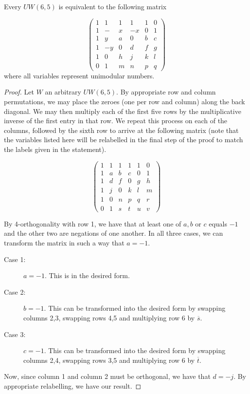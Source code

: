 \begin{lemma} \label{lem:uw65-norm}
 Every $UW(6,5)$ is equivalent to the following matrix

$$\left(\begin{array}{rrrrrr}
 1 &  1 & 1 & 1 & 1 & 0 \\
 1 &  - & x & -x & 0 & 1 \\
 1 &  y & a & 0 & b & c \\
 1 &  -y & 0 & d & f & g \\
 1 &  0 & h & j & k & l \\
 0 &  1 & m & n & p & q
\end{array}\right)$$
where all variables represent unimodular numbers.

\begin{proof}
 Let $W$ an arbitrary $UW(6,5)$. By appropriate row and column permutations, we may place the zeroes (one per row and column) along the back diagonal. We may then multiply each of the first five rows by the multiplicative inverse of the first entry in that row. We repeat this process on each of the columns, followed by the sixth row to arrive at the following matrix (note that the variables listed here will be relabelled in the final step of the proof to match the labels given in the statement).

$$\left(\begin{array}{rrrrrr}
 1 &  1 & 1 & 1 & 1 & 0 \\
 1 &  a & b & c & 0 & 1 \\
 1 &  d & f & 0 & g & h \\
 1 &  j & 0 & k & l & m \\
 1 &  0 & n & p & q & r \\
 0 &  1 & s & t & u & v
\end{array}\right)$$

By 4-orthogonality with row 1, we have that at least one of $a,b$ or $c$ equals $-1$ and the other two are negations of one another. In all three cases, we can transform the matrix in such a way that $a=-1$.

\begin{description}
 \item[Case 1:] $a = -1$. This is in the desired form.
 \item[Case 2:] $b = -1$. This can be transformed into the desired form by swapping columns 2,3, swapping rows 4,5 and multiplying row 6 by $\overline{s}$.
 \item[Case 3:] $c = -1$. This can be transformed into the desired form by swapping columns 2,4, swapping rows 3,5 and multiplying row 6 by $\overline{t}$.
\end{description}

Now, since column 1 and column 2 must be orthogonal, we have that $d = -j$. By appropriate relabelling, we have our result.
\end{proof}
\end{lemma}

